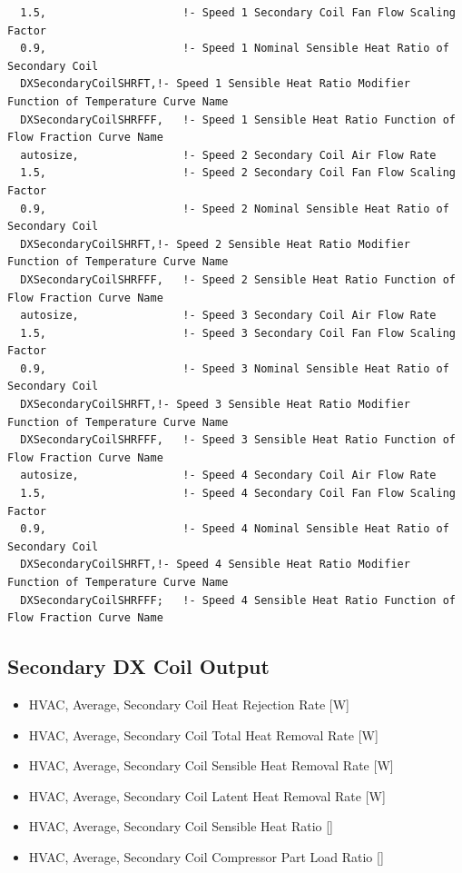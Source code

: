\begin{lstlisting}
  1.5,                     !- Speed 1 Secondary Coil Fan Flow Scaling Factor
  0.9,                     !- Speed 1 Nominal Sensible Heat Ratio of Secondary Coil
  DXSecondaryCoilSHRFT,!- Speed 1 Sensible Heat Ratio Modifier Function of Temperature Curve Name
  DXSecondaryCoilSHRFFF,   !- Speed 1 Sensible Heat Ratio Function of Flow Fraction Curve Name
  autosize,                !- Speed 2 Secondary Coil Air Flow Rate
  1.5,                     !- Speed 2 Secondary Coil Fan Flow Scaling Factor
  0.9,                     !- Speed 2 Nominal Sensible Heat Ratio of Secondary Coil
  DXSecondaryCoilSHRFT,!- Speed 2 Sensible Heat Ratio Modifier Function of Temperature Curve Name
  DXSecondaryCoilSHRFFF,   !- Speed 2 Sensible Heat Ratio Function of Flow Fraction Curve Name
  autosize,                !- Speed 3 Secondary Coil Air Flow Rate
  1.5,                     !- Speed 3 Secondary Coil Fan Flow Scaling Factor
  0.9,                     !- Speed 3 Nominal Sensible Heat Ratio of Secondary Coil
  DXSecondaryCoilSHRFT,!- Speed 3 Sensible Heat Ratio Modifier Function of Temperature Curve Name
  DXSecondaryCoilSHRFFF,   !- Speed 3 Sensible Heat Ratio Function of Flow Fraction Curve Name
  autosize,                !- Speed 4 Secondary Coil Air Flow Rate
  1.5,                     !- Speed 4 Secondary Coil Fan Flow Scaling Factor
  0.9,                     !- Speed 4 Nominal Sensible Heat Ratio of Secondary Coil
  DXSecondaryCoilSHRFT,!- Speed 4 Sensible Heat Ratio Modifier Function of Temperature Curve Name
  DXSecondaryCoilSHRFFF;   !- Speed 4 Sensible Heat Ratio Function of Flow Fraction Curve Name
\end{lstlisting}

\subsection{Secondary DX Coil Output}\label{secondary-dx-coil-output}

\begin{itemize}
\item
  HVAC, Average, Secondary Coil Heat Rejection Rate {[}W{]}
\item
  HVAC, Average, Secondary Coil Total Heat Removal Rate {[}W{]}
\item
  HVAC, Average, Secondary Coil Sensible Heat Removal Rate {[}W{]}
\item
  HVAC, Average, Secondary Coil Latent Heat Removal Rate {[}W{]}
\item
  HVAC, Average, Secondary Coil Sensible Heat Ratio {[]}
\item
  HVAC, Average, Secondary Coil Compressor Part Load Ratio {[]}
\end{itemize}

